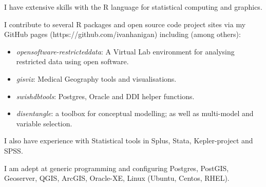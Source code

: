 \documentclass[a4paper,11pt]{article}
\begin{document}
\medskip
\renewcommand{\labelenumi}{\textsc{i}\theenumi.}
\begin{revnumerate}

\item I have extensive skills with the R language for statistical computing and graphics.

\item I contribute to several R packages and open source code project sites via my GitHub pages (https://github.com/ivanhanigan) including (among others): 

\begin{itemize}
\item \emph{opensoftware-restricteddata}: A Virtual Lab environment for analysing restricted data using open software.
\item \emph{gisviz}: Medical Geography tools and visualisations.
\item \emph{swishdbtools}: Postgres, Oracle and DDI helper functions.
\item \emph{disentangle}: a toolbox for conceptual modelling; as well as multi-model and variable selection.
\end{itemize}

\item I also have experience with Statistical tools in Splus, Stata, Kepler-project and SPSS.

\item I am adept at generic programming and configuring Postgres, PostGIS, Geoserver, QGIS, ArcGIS,  Oracle-XE, Linux (Ubuntu, Centos, RHEL).
\end{revnumerate}
\end{document}
